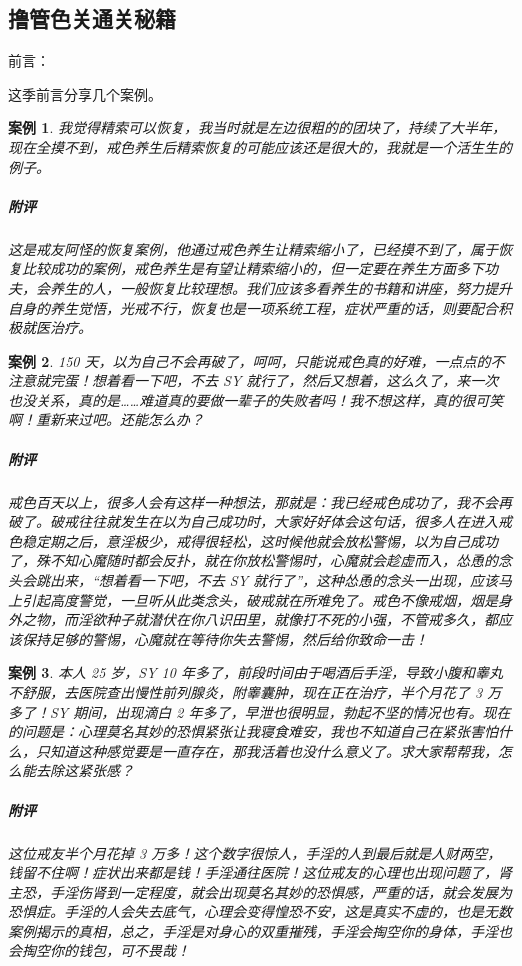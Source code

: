 \documentclass{ctexart}
\newtheorem{case}{案例}
\begin{document}
\subsection{撸管色关通关秘籍}

前言：

这季前言分享几个案例。

\begin{case}
    我觉得精索可以恢复，我当时就是左边很粗的的团块了，持续了大半年，现在全摸不到，戒色养生后精索恢复的可能应该还是很大的，我就是一个活生生的例子。
    \subparagraph{附评} 这是戒友阿怪的恢复案例，他通过戒色养生让精索缩小了，已经摸不到了，属于恢复比较成功的案例，戒色养生是有望让精索缩小的，但一定要在养生方面多下功夫，会养生的人，一般恢复比较理想。我们应该多看养生的书籍和讲座，努力提升自身的养生觉悟，光戒不行，恢复也是一项系统工程，症状严重的话，则要配合积极就医治疗。
\end{case}

\begin{case}
    150 天，以为自己不会再破了，呵呵，只能说戒色真的好难，一点点的不注意就完蛋！想着看一下吧，不去 SY 就行了，然后又想着，这么久了，来一次也没关系，真的是……难道真的要做一辈子的失败者吗！我不想这样，真的很可笑啊！重新来过吧。还能怎么办？
    \subparagraph{附评} 戒色百天以上，很多人会有这样一种想法，那就是：我已经戒色成功了，我不会再破了。破戒往往就发生在以为自己成功时，大家好好体会这句话，很多人在进入戒色稳定期之后，意淫极少，戒得很轻松，这时候他就会放松警惕，以为自己成功了，殊不知心魔随时都会反扑，就在你放松警惕时，心魔就会趁虚而入，怂恿的念头会跳出来，“想着看一下吧，不去 SY 就行了”，这种怂恿的念头一出现，应该马上引起高度警觉，一旦听从此类念头，破戒就在所难免了。戒色不像戒烟，烟是身外之物，而淫欲种子就潜伏在你八识田里，就像打不死的小强，不管戒多久，都应该保持足够的警惕，心魔就在等待你失去警惕，然后给你致命一击！
\end{case}

\begin{case}
    本人 25 岁，SY 10 年多了，前段时间由于喝酒后手淫，导致小腹和睾丸不舒服，去医院查出慢性前列腺炎，附睾囊肿，现在正在治疗，半个月花了 3 万多了！SY 期间，出现滴白 2 年多了，早泄也很明显，勃起不坚的情况也有。现在的问题是：心理莫名其妙的恐惧紧张让我寝食难安，我也不知道自己在紧张害怕什么，只知道这种感觉要是一直存在，那我活着也没什么意义了。求大家帮帮我，怎么能去除这紧张感？
    \subparagraph{附评} 这位戒友半个月花掉 3 万多！这个数字很惊人，手淫的人到最后就是人财两空，钱留不住啊！症状出来都是钱！手淫通往医院！这位戒友的心理也出现问题了，肾主恐，手淫伤肾到一定程度，就会出现莫名其妙的恐惧感，严重的话，就会发展为恐惧症。手淫的人会失去底气，心理会变得惶恐不安，这是真实不虚的，也是无数案例揭示的真相，总之，手淫是对身心的双重摧残，手淫会掏空你的身体，手淫也会掏空你的钱包，可不畏哉！
\end{case}
\end{document}
